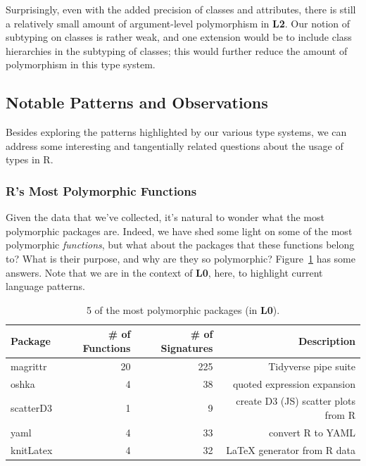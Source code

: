 \documentclass[acmsmall,10pt,review,anonymous]{acmart}\settopmatter{printfolios=true,printccs=false,printacmref=false}
\begin{document}
Surprisingly, even with the added precision of classes and attributes, there is still a relatively small amount of argument-level polymorphism in {\bf L2}.
Our notion of subtyping on classes is rather weak, and one extension would be to include class hierarchies in the subtyping of classes;
this would further reduce the amount of polymorphism in this type system.

%
%
%
%
\subsection{Notable Patterns and Observations}

Besides exploring the patterns highlighted by our various type systems, we can address some interesting and tangentially related questions about the usage of types in R.

%
%
%
%
\subsubsection{R's Most Polymorphic Functions}

Given the data that we've collected, it's natural to wonder what the most polymorphic packages are.
Indeed, we have shed some light on some of the most polymorphic {\it functions}, but what about the packages that these functions belong to?
What is their purpose, and why are they so polymorphic?
Figure~\ref{tab:packagepolysize} has some answers.
Note that we are in the context of {\bf L0}, here, to highlight current language patterns.

\begin{table}[ht]
\centering
\begin{tabular}{lrrr}
  \hline
  Package & \# of Functions &\# of Signatures & Description \\ 
  \hline
  magrittr & 20 & 225 & Tidyverse pipe suite \\ 
  oshka & 4 & 38 & quoted expression expansion \\ 
  scatterD3 & 1 & 9 & create D3 (JS) scatter plots from R \\ 
  yaml & 4 & 33 & convert R to YAML \\ 
  knitLatex & 4 & 32 & \LaTeX \xspace generator from R data \\ 
   \hline
\end{tabular}
\caption{5 of the most polymorphic packages (in {\bf L0}).}
\label{tab:packagepolysize}
\end{table}
\end{document}
